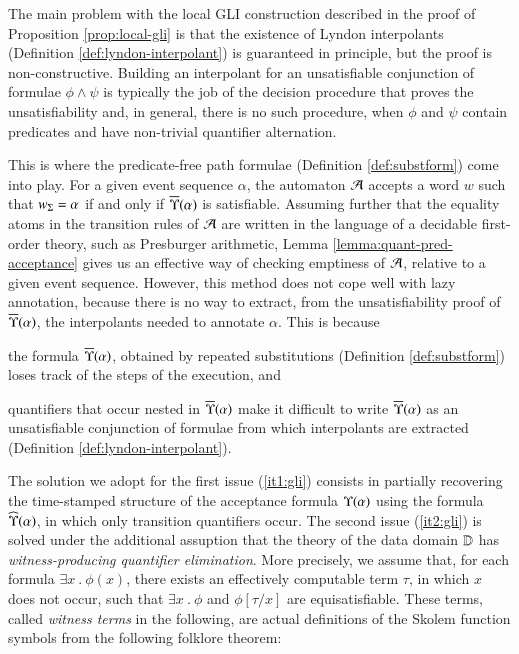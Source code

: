 \documentclass{llncs}
\begin{document}
The main problem with the local GLI construction described in the
proof of Proposition \ref{prop:local-gli} is that the existence of
Lyndon interpolants (Definition \ref{def:lyndon-interpolant}) is
guaranteed in principle, but the proof is non-constructive. Building
an interpolant for an unsatisfiable conjunction of formulae $\phi
\wedge \psi$ is typically the job of the decision procedure that
proves the unsatisfiability and, in general, there is no such
procedure, when $\phi$ and $\psi$ contain predicates and have
non-trivial quantifier alternation.

This is where the predicate-free path formulae (Definition
\ref{def:substform}) come into play. For a given event sequence
$\alpha$, the automaton $\mathcal{A}$ accepts a word $w$ such that ${w}_\Sigma =
\alpha$ if and only if $\overline{\Upsilon}({\alpha})$ is satisfiable. Assuming
further that the equality atoms in the transition rules of $\mathcal{A}$ are
written in the language of a decidable first-order theory, such as
Presburger arithmetic, Lemma \ref{lemma:quant-pred-acceptance} gives
us an effective way of checking emptiness of $\mathcal{A}$, relative to a given
event sequence. However, this method does not cope well with lazy
annotation, because there is no way to extract, from the
unsatisfiability proof of $\overline{\Upsilon}({\alpha})$, the interpolants
needed to annotate $\alpha$. This is because \begin{inparaenum}[(i)]
\item\label{it1:gli} the formula $\overline{\Upsilon}({\alpha})$, obtained by
  repeated substitutions (Definition \ref{def:substform}) loses track
  of the steps of the execution, and
%
\item\label{it2:gli} quantifiers that occur nested in
  $\overline{\Upsilon}({\alpha})$ make it difficult to write $\overline{\Upsilon}({\alpha})$
  as an unsatisfiable conjunction of formulae from which interpolants
  are extracted (Definition \ref{def:lyndon-interpolant}).
\end{inparaenum}

The solution we adopt for the first issue (\ref{it1:gli}) consists in
partially recovering the time-stamped structure of the acceptance
formula $\Upsilon({\alpha})$ using the formula $\widehat{\Upsilon}({\alpha})$, in
which only transition quantifiers occur. The second issue
(\ref{it2:gli}) is solved under the additional assuption that the
theory of the data domain $\mathbb{D}$ has \emph{witness-producing
  quantifier elimination}. More precisely, we assume that, for each
formula $\exists x ~.~ \phi(x)$, there exists an effectively
computable term $\tau$, in which $x$ does not occur, such that
$\exists x ~.~ \phi$ and $\phi[\tau/x]$ are equisatisfiable. These
terms, called \emph{witness terms} in the following, are actual
definitions of the Skolem function symbols from the following folklore
theorem:
\end{document}
